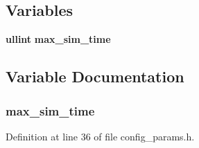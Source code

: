 \subsection*{Variables}
\begin{CompactItemize}
\item 
{\bf ullint} {\bf max\_\-sim\_\-time}
\end{CompactItemize}


\subsection{Variable Documentation}
\subsubsection[{max\_\-sim\_\-time}]{ {\bf max\_\-sim\_\-time}}\label{genericLink_8h_a340b2edbc363c0c05db68a8f5212f0f}




Definition at line 36 of file config\_\-params.h.